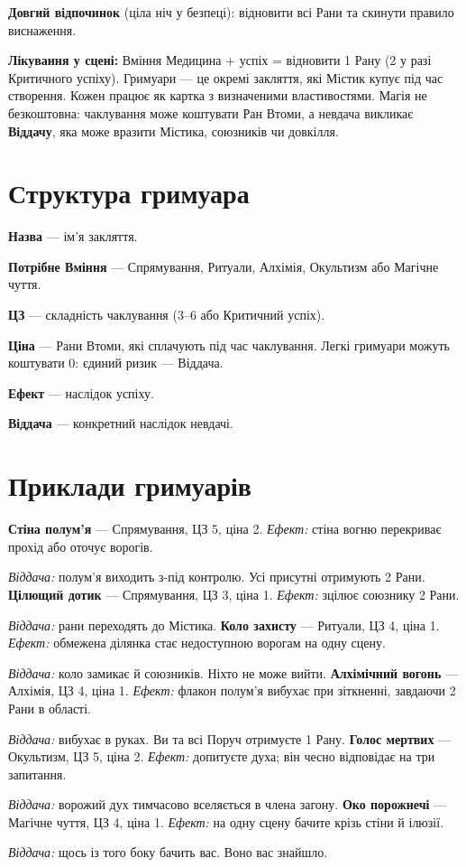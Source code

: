 \documentclass[10pt,a4paper]{article}
\begin{document}
\textbf{Довгий відпочинок} (ціла ніч у безпеці): відновити всі Рани та скинути правило виснаження.

\textbf{Лікування у сцені:} Вміння Медицина + успіх = відновити 1 Рану (2 у разі Критичного успіху).
Гримуари — це окремі закляття, які Містик купує під час створення. Кожен працює як картка з визначеними властивостями. Магія не безкоштовна: чаклування може коштувати Ран Втоми, а невдача викликає \textbf{Віддачу}, яка може вразити Містика, союзників чи довкілля.
\section*{Структура гримуара}
\textbf{Назва} — ім'я закляття.

\textbf{Потрібне Вміння} — Спрямування, Ритуали, Алхімія, Окультизм або Магічне чуття.

\textbf{ЦЗ} — складність чаклування (3–6 або Критичний успіх).

\textbf{Ціна} — Рани Втоми, які сплачують під час чаклування. Легкі гримуари можуть коштувати 0: єдиний ризик — Віддача.

\textbf{Ефект} — наслідок успіху.

\textbf{Віддача} — конкретний наслідок невдачі.
\section*{Приклади гримуарів}
\textbf{Стіна полум'я} — Спрямування, ЦЗ 5, ціна 2.
\textit{Ефект:} стіна вогню перекриває прохід або оточує ворогів.\par
\textit{Віддача:} полум'я виходить з-під контролю. Усі присутні отримують 2 Рани.
\medskip
\textbf{Цілющий дотик} — Спрямування, ЦЗ 3, ціна 1.
\textit{Ефект:} зцілює союзнику 2 Рани.\par
\textit{Віддача:} рани переходять до Містика.
\medskip
\textbf{Коло захисту} — Ритуали, ЦЗ 4, ціна 1.
\textit{Ефект:} обмежена ділянка стає недоступною ворогам на одну сцену.\par
\textit{Віддача:} коло замикає й союзників. Ніхто не може вийти.
\medskip
\textbf{Алхімічний вогонь} — Алхімія, ЦЗ 4, ціна 1.
\textit{Ефект:} флакон полум'я вибухає при зіткненні, завдаючи 2 Рани в області.\par
\textit{Віддача:} вибухає в руках. Ви та всі Поруч отримуєте 1 Рану.
\medskip
\textbf{Голос мертвих} — Окультизм, ЦЗ 5, ціна 2.
\textit{Ефект:} допитуєте духа; він чесно відповідає на три запитання.\par
\textit{Віддача:} ворожий дух тимчасово вселяється в члена загону.
\medskip
\textbf{Око порожнечі} — Магічне чуття, ЦЗ 4, ціна 1.
\textit{Ефект:} на одну сцену бачите крізь стіни й ілюзії.\par
\textit{Віддача:} щось із того боку бачить вас. Воно вас знайшло.
\end{document}

